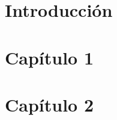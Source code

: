 \documentclass[11pt]{article}
\begin{document}
\renewcommand{\tablename}{Tabla}

\thispagestyle{empty}


\newpage
{}



\newpage


\tableofcontents
\newpage



\renewcommand{\listfigurename}{Lista de Figuras}
\listoffigures
\newpage


\renewcommand{\listtablename}{Lista de Tablas} 
\listoftables
\newpage



\section{Introducción}\label{sec:introduccion}
  
  \newpage

 \section{Capítulo 1}\label{sec:cap1}
   
   \newpage

 \section{Capítulo 2}\label{sec:cap2}
   
   \newpage




%
	
\end{document}
